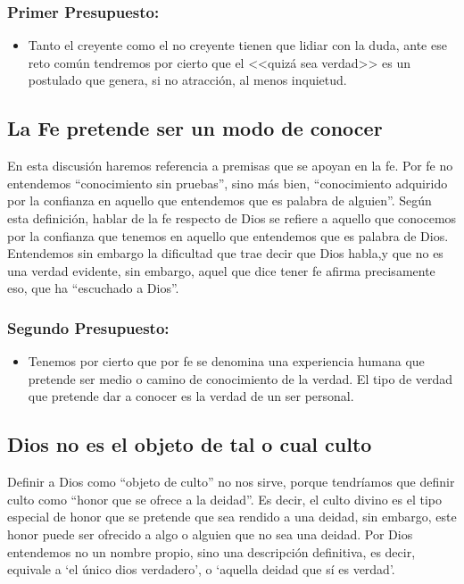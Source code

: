 \documentclass[10pt]{article}
\begin{document}
\subsubsection{Primer Presupuesto:}
\begin{itemize}
\item Tanto el creyente como el no creyente tienen que lidiar con la duda, ante
  ese reto común tendremos por cierto que el <<quizá sea verdad>> es un
  postulado que genera, si no atracción, al menos inquietud.
\end{itemize}

\subsection{La Fe pretende ser un modo de conocer}
En esta discusión haremos referencia a premisas que se apoyan en la fe. Por fe
no entendemos ``conocimiento sin pruebas'', sino más bien, ``conocimiento
adquirido por la confianza en aquello que entendemos que es palabra de
alguien''. Según esta definición, hablar de la fe respecto de Dios se refiere a
aquello que conocemos por la confianza que tenemos en aquello que entendemos que
es palabra de Dios. Entendemos sin embargo la dificultad que trae decir que Dios
habla,y que no es una verdad evidente, sin embargo, aquel que dice tener fe
afirma precisamente eso, que ha ``escuchado a Dios''.

\subsubsection{Segundo Presupuesto:}
\begin{itemize}
\item Tenemos por cierto que por fe se denomina una experiencia humana que
  pretende ser medio o camino de conocimiento de la verdad. El tipo de verdad
  que pretende dar a conocer es la verdad de un ser personal.
\end{itemize}

\subsection{Dios no es el objeto de tal o cual culto}
 
Definir a Dios como ``objeto de culto'' no nos sirve, porque tendríamos que
definir culto como ``honor que se ofrece a la deidad''. Es decir, el culto
divino es el tipo especial de honor que se pretende que sea rendido a una
deidad, sin embargo, este honor puede ser ofrecido a algo o alguien que no sea
una deidad. Por Dios entendemos no un nombre propio, sino una descripción
definitiva, es decir, equivale a `el único dios verdadero', o `aquella deidad
que sí es verdad'.
\end{document}
